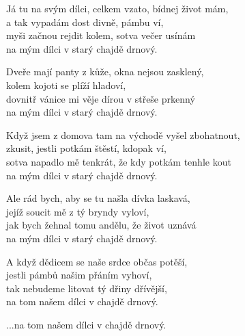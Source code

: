 
\ve{}
Já tu na svým dílci, celkem vzato, bídnej život mám,\\
a tak vypadám dost divně, pámbu ví,\\
myši začnou rejdit kolem, sotva večer usínám\\
na mým dílci v starý chajdě drnový. 

\cho{}
Dveře mají panty z kůže, okna nejsou zasklený,\\
kolem kojoti se plíží hladoví,\\
dovnitř vánice mi věje dírou v střeše prkenný\\
na mým dílci v starý chajdě drnový.

\ve{}
Když jsem z domova tam na východě vyšel zbohatnout,\\
zkusit, jestli potkám štěstí, kdopak ví,\\
sotva napadlo mě tenkrát, že kdy potkám tenhle kout\\
na mým dílci v starý chajdě drnový.

\cho{}

\ve{}
Ale rád bych, aby se tu našla dívka laskavá,\\
jejíž soucit mě z tý bryndy vyloví,\\
jak bych žehnal tomu andělu, že život uznává\\
na mým dílci v starý chajdě drnový.

\cho{}

\ve{}
A když dědicem se naše srdce občas potěší,\\
jestli pámbů našim přáním vyhoví,\\
tak nebudeme litovat tý dřiny dřívější,\\
na tom našem dílci v chajdě drnový.

\cho{}
...na tom našem dílci v chajdě drnový.

\esong